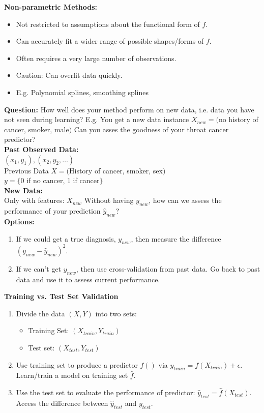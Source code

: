 \documentclass{article}
\begin{document}
\textbf{Non-parametric Methods:}
\begin{itemize}
    \item Not restricted to assumptions about the functional form of $f$.
    \item Can accurately fit a wider range of possible shapes/forms of $f$.
    \item Often requires a very large number of observations.
    \item Caution: Can overfit data quickly.
    \item E.g. Polynomial splines, smoothing splines\\
\end{itemize}
\textbf{Question:}
How well does your method perform on new data, i.e. data you have not seen during learning?
E.g. You get a new data instance
$X_{new} = ($no history of cancer, smoker, male$)$
Can you asses the goodness of your throat cancer predictor?\\
\textbf{Past Observed Data:}\\
$(x_{1}, y_{1}), (x_{2}, y_{2},\ldots)$\\
Previous Data
$X = ($History of cancer, smoker, sex$)$\\
$y = \{$0 if no cancer, 1 if cancer$\}$\\
\textbf{New Data:}\\
Only with features: $X_{new}$
Without having $y_{new}$, how can we assess the performance of your prediction $\hat{y}_{new}$?\\
\textbf{Options:}
\begin{enumerate}
    \item If we could get a true diagnosis, $y_{new}$, then measure the difference $(y_{new} - \hat{y}_{new})^2$.
    \item If we can't get $y_{new}$, then use cross-validation from past data. Go back to past data and use it to assess current performance.
\end{enumerate}
\textbf{Training vs. Test Set Validation}
\begin{enumerate}
    \item Divide the data $(X, Y)$ into two sets:
    \begin{itemize}
        \item Training Set: $(X_{train}, Y_{train})$
        \item Test set: $(X_{test}, Y_{test})$
    \end{itemize}
    \item Use training set to produce a predictor $\hat{f}()$ via $y_{train} = f(X_{train}) + \epsilon$. Learn/train a model on training set $\hat{f}$.
    \item Use the test set to evaluate the performance of predictor: $\hat{y}_{test} = \hat{f}(X_{test})$. Access the difference between $\hat{y}_{test}$ and $y_{test}$.
\end{enumerate}
\end{document}
